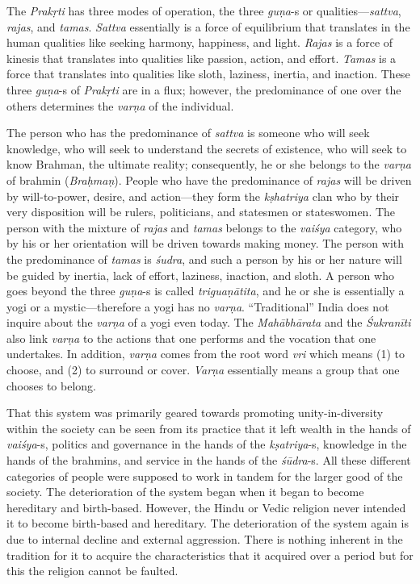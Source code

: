 The \textit{Prakṛti}  has three modes of operation, the three \textit{guṇa}-s or qualities—\textit{sattva},  \textit{rajas},   and \textit{tamas}. \textit{Sattva} essentially is a force of equilibrium that translates in the human qualities like seeking harmony, happiness, and light. \textit{Rajas} is a force of kinesis that translates into qualities like passion, action, and effort. \textit{Tamas} is a force that translates into qualities like sloth, laziness, inertia, and inaction. These three \textit{guṇa}-s of \textit{Prakṛti}  are in a flux; however, the predominance of one over the others determines the \textit{varṇa} of the individual.


The person who has the predominance of \textit{sattva} is someone who will seek knowledge, who will seek to understand the secrets of existence, who will seek to know Brahman, the ultimate reality; consequently, he or she belongs to the \textit{varṇa} of brahmin (\textit{Braḥmaṇ}). People who have the predominance of \textit{rajas} will be driven by will-to-power, desire, and action—they form the \textit{kṣhatriya} clan who by their very disposition will be rulers, politicians, and statesmen or stateswomen. The person with the mixture of \textit{rajas} and \textit{tamas} belongs to the \textit{vaiśya} category, who by his or her orientation will be driven towards making money. The person with the predominance of \textit{tamas} is \textit{śudra},  and such a person by his or her nature will be guided by inertia, lack of effort, laziness, inaction, and sloth. A person who goes beyond the three \textit{guṇa}-s is called \textit{triguaṇātita},  and he or she is essentially a yogi or a mystic—therefore a yogi has no \textit{varṇa}. “Traditional” India does not inquire about the \textit{varṇa} of a yogi even today. The \textit{Mahābhārata} and the \textit{Śukranīti} also link \textit{varṇa} to the actions that one performs and the vocation that one undertakes. In addition, \textit{varṇa} comes from the root word \textit{vri} which means (1) to choose, and (2) to surround or cover. \textit{Varṇa} essentially means a group that one chooses to belong.

That this system was primarily geared towards promoting unity-in-diversity within the society can be seen from its practice that it left wealth in the hands of \textit{vaiśya}-s,  politics and governance in the hands of the \hbox{\textit{kṣatriya}-s},  knowledge in the hands of the brahmins, and service in the hands of the \textit{śūdra}-s. All these different categories of people were supposed to work in tandem for the larger good of the society. The deterioration of the system began when it began to become hereditary and birth-based. However, the Hindu or Vedic religion never intended it to become birth-based and hereditary. The deterioration of the system again is due to internal decline and external aggression. There is nothing inherent in the tradition for it to acquire the characteristics that it acquired over a period but for this the religion cannot be faulted.
\eject

